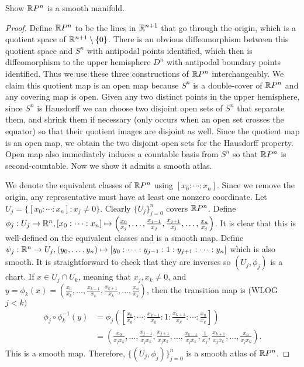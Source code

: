 \documentclass[12pt]{article}
\begin{document}
\begin{problem}[4.2]
Show $ \mathbb{R} P^{n}$ is a smooth manifold.
\end{problem}
\begin{proof}
Define $ \mathbb{R} P^{n}$ to be the lines in $ \mathbb{R}^{n+1}$ that go through the origin, which is a quotient space of $ \mathbb{R}^{n+1} \setminus \{0\} $. There is an obvious diffeomorphism between this quotient space and $ S^{n}$ with antipodal points identified, which then is diffeomorphism to the upper hemisphere $ D^{n}$ with antipodal boundary points identified. Thus we use these three constructions of $ \mathbb{R} P^{n}$ interchangeably. We claim this quotient map is an open map because $ S^{n}$ is a double-cover of $ \mathbb{R} P^{n}$ and any covering map is open. Given any two distinct points in the upper hemisphere, since $ S^{n}$ is Hausdorff we can choose two disjoint open sets of $ S^{n}$ that separate them, and shrink them if necessary (only occurs when an open set crosses the equator) so that their quotient images are disjoint as well. Since the quotient map is an open map, we obtain the two disjoint open sets for the Hausdorff property. Open map also immediately induces a countable basis from $ S^{n}$ so that $ \mathbb{R} P^{n}$ is second-countable. Now we show it admits a smooth atlas.

We denote the equivalent classes of $ \mathbb{R} P^{n}$ using $ [x_0:\cdots :x_n]$. Since we remove the origin, any representative must have at least one nonzero coordinate. Let $ U_j = \{[x_0:\cdots :x_n]: x_j \neq 0\} $. Clearly $ \{U_j\}_{j=0}^{n}$ covers $ \mathbb{R} P^{n}$. Define $ \phi_j: U_j \to \mathbb{R}^{n}, [x_0: \cdots : x_n] \mapsto \left(\frac{x_0}{x_j},\ldots,\frac{x_{j-1}}{x_j}, \frac{x_{j+1}}{ x_j},\ldots, \frac{x_n}{ x_j}\right)$. It is clear that this is well-defined on the equivalent classes and is a smooth map. Define $ \psi_j: \mathbb{R}^{n} \to U_j, (y_0,\ldots,y_n) \mapsto [y_0: \cdots : y_{j-1}:1:y_{j+1}: \cdots :y_n]$ which is also smooth. It is straightforward to check that they are inverses so $ (U_j, \phi_j)$ is a chart. If $ x \in U_j \cap U_k$, meaning that $ x_j,x_k \neq 0$, and $ y = \phi_k(x) = \left( \frac{x_0}{x_k},\ldots, \frac{x_{k-1}}{ x_k}, \frac{x_{k+1}}{ x_k},\ldots, \frac{x_n}{ x_k} \right) $, then the transition map is (WLOG $ j<k)$
\begin{align*}
	\phi_j \circ \phi_k^{-1}(y) &= \phi_j \left( \left[ \frac{x_0}{x_k}:\cdots : \frac{x_{k-1}}{ x_k}:1: \frac{x_{k+1}}{ x_k}:\cdots: \frac{x_n}{ x_k}  \right]  \right)  \\
	&= \left( \frac{x_0}{x_j x_k},\ldots, \frac{x_{j-1}}{ x_j x_k}, \frac{x_{j+1}}{ x_j x_k},\ldots, \frac{x_{k-1}}{ x_j x_k}, \frac{1}{ x_j}, \frac{x_{k+1}}{x_j x_k},\ldots, \frac{x_n}{x_j x_k}\right).
\end{align*}
This is a smooth map. Therefore, $ \{(U_j, \phi_j)\}_{j=0}^{n} $ is a smooth atlas of $ \mathbb{R} P^{n}$.
\end{proof}
\end{document}
